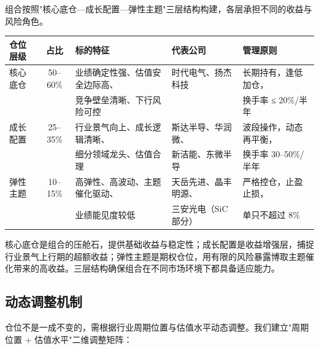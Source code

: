 组合按照"核心底仓—成长配置—弹性主题"三层结构构建，各层承担不同的收益与风险角色。

\begin{exhibitbox}[表 11-9：三层仓位结构与配置原则]
\centering
\small
\begin{tabularx}{\textwidth}{X c L{3.5cm} L{3.0cm} L{3.5cm}}
\toprule
\textbf{仓位层级} & \textbf{占比} & \textbf{标的特征} & \textbf{代表公司} & \textbf{管理原则} \\
\midrule
{}
核心底仓 & 50–60\% & 业绩确定性强、估值安全边际高、 & 时代电气、扬杰科技 & 长期持有，逢低加仓， \\
& & 竞争壁垒清晰、下行风险可控 & & 换手率 ≤ 20\%/半年 \\
\midrule
{}
成长配置 & 25–35\% & 行业景气向上、成长逻辑清晰、 & 斯达半导、华润微、 & 波段操作，动态再平衡， \\
& & 细分领域龙头、估值合理 & 新洁能、东微半导 & 换手率 30–50\%/半年 \\
\midrule
{}
弹性主题 & 10–15\% & 高弹性、高波动、主题催化驱动、 & 天岳先进、晶丰明源、 & 严格控仓，止盈止损， \\
& & 业绩能见度较低 & 三安光电（SiC 部分） & 单只不超过 8\% \\
\bottomrule
\end{tabularx}
\end{exhibitbox}

核心底仓是组合的压舱石，提供基础收益与稳定性；成长配置是收益增强层，捕捉行业景气上行期的超额收益；弹性主题是期权仓位，用有限的风险暴露博取主题催化带来的高收益。三层结构确保组合在不同市场环境下都具备适应能力。

\subsection{动态调整机制}

仓位不是一成不变的，需根据行业周期位置与估值水平动态调整。我们建立"周期位置 + 估值水平"二维调整矩阵：

